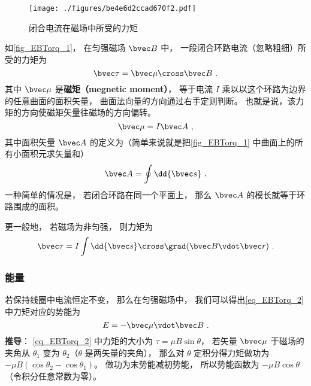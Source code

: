 
\begin{figure}[ht]
\centering
\texttt{[image: ./figures/be4e6d2ccad670f2.pdf]}
\caption{闭合电流在磁场中所受的力矩} \label{fig_EBTorq_1}
\end{figure}

如\autoref{fig_EBTorq_1}， 在匀强磁场 $\bvec B$ 中， 一段闭合环路电流（忽略粗细）所受的力矩为
\begin{equation}\label{eq_EBTorq_2}
\bvec \tau = \bvec \mu \cross \bvec B~.
\end{equation}
其中 $\bvec \mu$ 是\textbf{磁矩（megnetic moment）}， 等于电流 $I$ 乘以以这个环路为边界的任意曲面的面积矢量， 曲面法向量的方向通过右手定则判断。 也就是说，该力矩的方向使磁矩矢量往磁场的方向偏转。
\begin{equation}
\bvec \mu = I \bvec A~,
\end{equation}
其中面积矢量 $\bvec A$ 的定义为（简单来说就是把\autoref{fig_EBTorq_1} 中曲面上的所有小面积元求矢量和）
\begin{equation}
\bvec A = \oint \dd{\bvec s}~.
\end{equation}
一种简单的情况是， 若闭合环路在同一个平面上， 那么 $\bvec A$ 的模长就等于环路围成的面积。

更一般地， 若磁场为非匀强， 则力矩为
\begin{equation}\label{eq_EBTorq_1}
\bvec \tau = I \int \dd{\bvec s}\cross\grad(\bvec B\vdot\bvec r)~.
\end{equation}

\subsubsection{能量}
若保持线圈中电流恒定不变， 那么在匀强磁场中， 我们可以得出\autoref{eq_EBTorq_2} 中力矩对应的势能为
\begin{equation}
E = -\bvec\mu \vdot \bvec B~.
\end{equation}
\textbf{推导}： \autoref{eq_EBTorq_2} 中力矩的大小为 $\tau = \mu B\sin\theta$， 若矢量 $\bvec\mu$ 于磁场的夹角从 $\theta_1$ 变为 $\theta_2$（$\theta$ 是两矢量的夹角）， 那么对 $\theta$ 定积分得力矩做功为 $-\mu B(\cos\theta_2-\cos\theta_1)$。 做功为末势能减初势能， 所以势能函数为 $-\mu B\cos\theta$（令积分任意常数为零）。

